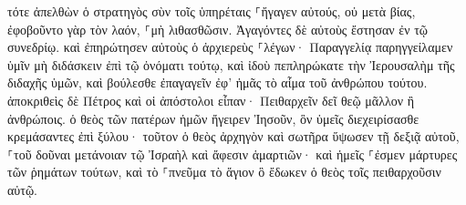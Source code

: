 \documentclass{openreader}
\begin{document}
τότε ἀπελθὼν ὁ στρατηγὸς σὺν τοῖς ὑπηρέταις ⸀ἤγαγεν αὐτούς, οὐ μετὰ βίας, ἐφοβοῦντο γὰρ τὸν λαόν, ⸀μὴ λιθασθῶσιν. 
Ἀγαγόντες δὲ αὐτοὺς ἔστησαν ἐν τῷ συνεδρίῳ. καὶ ἐπηρώτησεν αὐτοὺς ὁ ἀρχιερεὺς 
⸀λέγων· Παραγγελίᾳ παρηγγείλαμεν ὑμῖν μὴ διδάσκειν ἐπὶ τῷ ὀνόματι τούτῳ, καὶ ἰδοὺ πεπληρώκατε τὴν Ἰερουσαλὴμ τῆς διδαχῆς ὑμῶν, καὶ βούλεσθε ἐπαγαγεῖν ἐφ’ ἡμᾶς τὸ αἷμα τοῦ ἀνθρώπου τούτου. 
ἀποκριθεὶς δὲ Πέτρος καὶ οἱ ἀπόστολοι εἶπαν· Πειθαρχεῖν δεῖ θεῷ μᾶλλον ἢ ἀνθρώποις. 
ὁ θεὸς τῶν πατέρων ἡμῶν ἤγειρεν Ἰησοῦν, ὃν ὑμεῖς διεχειρίσασθε κρεμάσαντες ἐπὶ ξύλου· 
τοῦτον ὁ θεὸς ἀρχηγὸν καὶ σωτῆρα ὕψωσεν τῇ δεξιᾷ αὐτοῦ, ⸀τοῦ δοῦναι μετάνοιαν τῷ Ἰσραὴλ καὶ ἄφεσιν ἁμαρτιῶν· 
καὶ ἡμεῖς ⸀ἐσμεν μάρτυρες τῶν ῥημάτων τούτων, καὶ τὸ ⸀πνεῦμα τὸ ἅγιον ὃ ἔδωκεν ὁ θεὸς τοῖς πειθαρχοῦσιν αὐτῷ. 
\end{document}
